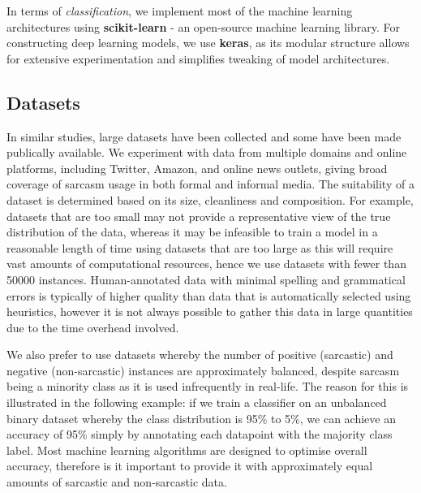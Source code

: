 \documentclass[12pt,a4paper]{article}
\begin{document}
In terms of \textit{classification}, we implement most of the machine learning architectures using \textbf{scikit-learn} - an open-source machine learning library. For constructing deep learning models, we use \textbf{keras}, as its modular structure allows for extensive experimentation and simplifies tweaking of model architectures.

\subsection{Datasets}
\noindent In similar studies, large datasets have been collected and some have been made publically available. We experiment with data from multiple domains and online platforms, including Twitter, Amazon, and online news outlets, giving broad coverage of sarcasm usage in both formal and informal media. The suitability of a dataset is determined based on its size, cleanliness and composition. For example, datasets that are too small may not provide a representative view of the true distribution of the data, whereas it may be infeasible to train a model in a reasonable length of time using datasets that are too large as this will require vast amounts of computational resources, hence we use datasets with fewer than 50000 instances. Human-annotated data with minimal spelling and grammatical errors is typically of higher quality than data that is automatically selected using heuristics, however it is not always possible to gather this data in large quantities due to the time overhead involved.

We also prefer to use datasets whereby the number of positive (sarcastic) and negative (non-sarcastic) instances are approximately balanced, despite sarcasm being a minority class as it is used infrequently in real-life. The reason for this is illustrated in the following example: if we train a classifier on an unbalanced binary dataset whereby the class distribution is 95\% to 5\%, we can achieve an accuracy of 95\% simply by annotating each datapoint with the majority class label. Most machine learning algorithms are designed to optimise overall accuracy, therefore is it important to provide it with approximately equal amounts of sarcastic and non-sarcastic data.\\


\end{document}
